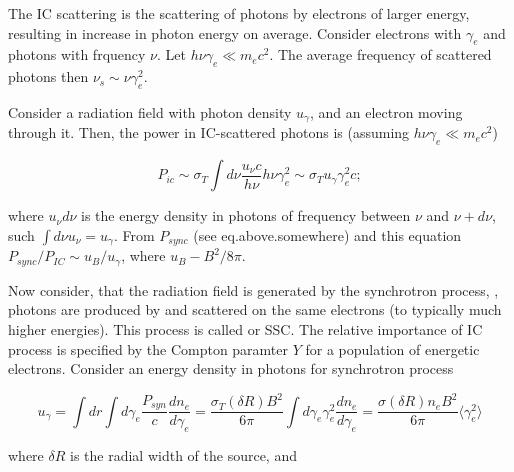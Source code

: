 The \ac{IC} scattering is the scattering of photons by electrons of larger energy, resulting in increase in photon energy on average.
Consider electrons with $\gamma_e$ and photons with frquency $\nu$. Let $h\nu\gamma_e \ll m_e c^2$. The average frequency of scattered photons then $\nu_s\sim\nu\gamma^2_e$.

Consider a radiation field with photon density $u_{\gamma}$, and an electron moving through it. 
Then, the power in \ac{IC}-scattered photons is (assuming $h\nu\gamma_e\ll m_e c^2$)

\begin{equation}
P_{ic} \sim \sigma_T \int d\nu \frac{u_{\nu} c}{h\nu} h\nu\gamma_e^2 \sim \sigma_T u_{\gamma}\gamma^2_e c;
\end{equation}

where $u_{\nu}d\nu$ is the energy density in photons of frequency between $\nu$ and $\nu+d\nu$, such $\int d\nu u_{\nu} = u_{\gamma}$. From $P_{sync}$ (see eq.above.somewhere) and this equation $P_{sync}/P_{IC} \sim u_{B}/u_{\gamma}$, where $u_{B}- B^2 / 8\pi$.

Now consider, that the radiation field is generated by the synchrotron process, \ie, photons are produced by and scattered on the same electrons (to typically much higher energies). This process is called  or \ac{SSC}.
The relative importance of \ac{IC} process is specified by the Compton paramter $Y$ for a population of energetic electrons. 
Consider an energy density in photons for synchrotron process

\begin{equation}
u_{\gamma} = \int dr \int d\gamma_e \frac{P_{syn}}{c}\frac{dn_e}{d\gamma_e} = \frac{\sigma_T (\delta R) B^2}{6\pi} \int d\gamma_e \gamma^2_e \frac{d n_e}{d\gamma_e} = \frac{\sigma (\delta R) n_e B^2}{6\pi}\langle\gamma_e^2\rangle
\end{equation}

where $\delta R$ is the radial width of the source, and 

